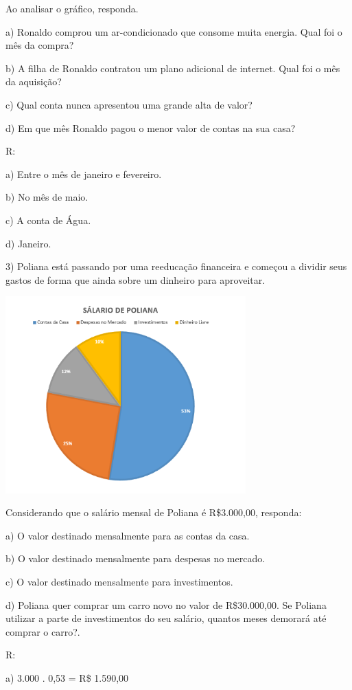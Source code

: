 Ao analisar o gráfico, responda.

a) Ronaldo comprou um ar-condicionado que consome muita energia. Qual
foi o mês da compra?

b) A filha de Ronaldo contratou um plano adicional de internet. Qual foi
o mês da aquisição?

c) Qual conta nunca apresentou uma grande alta de valor?

d) Em que mês Ronaldo pagou o menor valor de contas na sua casa?

R:

a) Entre o mês de janeiro e fevereiro.

b) No mês de maio.

c) A conta de Água.

d) Janeiro.

3) Poliana está passando por uma reeducação financeira e começou a
dividir seus gastos de forma que ainda sobre um dinheiro para
aproveitar.

\includegraphics[width=3.65in,height=2.98179in]{./imgSAEB_8_MAT/media/image41.png}

Considerando que o salário mensal de Poliana é R\$3.000,00, responda:

a) O valor destinado mensalmente para as contas da casa.

b) O valor destinado mensalmente para despesas no mercado.

c) O valor destinado mensalmente para investimentos.

d) Poliana quer comprar um carro novo no valor de R\$30.000,00. Se
Poliana utilizar a parte de investimentos do seu salário, quantos meses
demorará até comprar o carro?.

R:

a) 3.000 . 0,53 = R\$ 1.590,00

